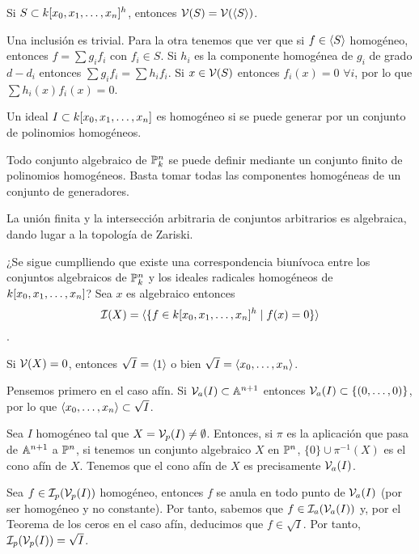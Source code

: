 \documentclass[ACGA.tex]{subfiles}
\begin{document}
\begin{prop}
Si $S\subset k[x_0,x_1,\dotsc,x_{n}]^h$, entonces $\mathcal{V}(S)=\mathcal{V}(\langle{S}\rangle)$. 
\end{prop}
\begin{dem}
Una inclusión es trivial. Para la otra tenemos que ver que si $f\in \langle{S}\rangle$ homogéneo, entonces $f=\sum g_i f_i$ con $f_i \in S$. Si $h_i$ es la componente homogénea de $g_i$ de grado $d-d_i$ entonces $\sum g_i f_i = \sum h_i f_i$. Si $x\in \mathcal{V}(S)$ entonces $f_i(x)=0$ $\forall i$, por lo que $\sum h_i (x) f_i (x) =0$. 
\end{dem}
\begin{defi}
Un ideal $I\subset k[x_0,x_1,\dotsc,x_{n}]$ es homogéneo si se puede generar por un conjunto de polinomios homogéneos. 
\end{defi}
\begin{prop}
Todo conjunto algebraico de $\mathbb{P}^n_k$ se puede definir mediante un conjunto finito de polinomios homogéneos. Basta tomar todas las componentes homogéneas de un conjunto de generadores.
\end{prop}
\begin{prop} La unión finita y la intersección arbitraria de conjuntos arbitrarios es algebraica, dando lugar a la topología de Zariski.
\end{prop}
¿Se sigue cumplliendo que existe una correspondencia biunívoca entre los conjuntos algebraicos de $\mathbb{P}^n_k$ y los ideales radicales homogéneos de $k[x_0,x_1,\dotsc,x_{n}]$?
Sea $x$ es algebraico entonces 
$$\mathcal{I}(X)=\langle{\{f\in k[x_0,x_1,\dotsc,x_{n}]^h \mid f(x)=0\}}\rangle$$.
\begin{prop}
Si $\mathcal{V}(X)=0$, entonces $\sqrt{I}=\langle{1}\rangle$ o bien $\sqrt{I}=\langle{x_0,\dotsc,x_n}\rangle$.
\end{prop}
\begin{dem}
Pensemos primero en el caso afín. Si $\mathcal{V}_{a}(I)\subset \mathbb{A}^{n+1}$ entonces $\mathcal{V}_{a}(I)\subset\{(0,\dotsc,0)\}$, por lo que $\langle{x_0,\dotsc,x_n}\rangle\subset \sqrt{I}$.
\end{dem}
Sea $I$ homogéneo tal que $X=\mathcal{V}_{p}(I)\neq \emptyset$. Entonces, si $\pi$ es la aplicación que pasa de $\mathbb{A}^{n+1}$ a $\mathbb{P}^n$, si tenemos un conjunto algebraico $X$ en $\mathbb{P}^n$, $\{0\}\cup\pi^{-1}(X)$ es el cono afín de $X$. Tenemos que el cono afín de $X$ es precisamente $\mathcal{V}_{a}(I)$.

Sea $f\in \mathcal{I}_p(\mathcal{V}_{p}(I))$ homogéneo, entonces $f$ se anula en todo punto de $\mathcal{V}_{a}(I)$ (por ser homogéneo y no constante). Por tanto, sabemos que $f\in \mathcal{I}_a(\mathcal{V}_{a}(I))$ y, por el Teorema de los ceros en el caso afín, deducimos que $f\in \sqrt{I}$. Por tanto, $\mathcal{I}_p(\mathcal{V}_{p}(I))=\sqrt{I}$.
\end{document}
